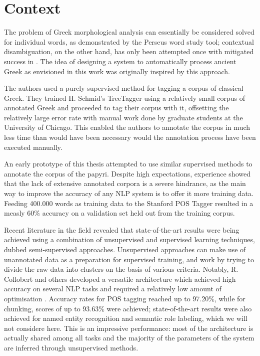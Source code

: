 \section{Context}

The problem of Greek morphological analysis can essentially be
considered solved for individual words, as demonstrated by the Perseus
word study tool; contextual disambiguation, on the other hand, has
only been attempted once with mitigated success in
\cite{dik2008,dik2009}. The idea of designing a system to
automatically process ancient Greek as envisioned in this work was
originally inspired by this approach.

The authors used a purely supervised method for tagging a corpus of
classical Greek. They trained H. Schmid's TreeTagger using a
relatively small corpus of annotated Greek and proceeded to tag their
corpus with it, offsetting the relatively large error rate with manual
work done by graduate students at the University of Chicago. This
enabled the authors to annotate the corpus in much less time than
would have been necessary would the annotation process have been
executed manually.

An early prototype of this thesis attempted to use similar supervised
methods to annotate the corpus of the papyri. Despite high
expectations, experience showed that the lack of extensive annotated
corpora is a severe hindrance, as the main way to improve the accuracy
of any NLP system is to offer it more training data. Feeding 400.000
words as training data to the Stanford POS Tagger resulted in a measly
60\% accuracy on a validation set held out from the training corpus.

Recent literature in the field revealed that state-of-the-art results
were being achieved using a combination of unsupervised and supervised
learning techniques, dubbed semi-supervised approaches. Unsupervised
approaches can make use of unannotated data as a preparation for
supervised training, and work by trying to divide the raw data into
clusters on the basis of various criteria. Notably, R. Collobert and
others developed a versatile architecture which achieved high accuracy
on several NLP tasks and required a relatively low amount of
optimisation \citep{collobert2008,collobert-2011}. Accuracy rates for
POS tagging reached up to 97.20\%, while for chunking, scores of up to
93.63\% were achieved; state-of-the-art results were also achieved for
named entity recognition and semantic role labeling, which we will not
considere here. This is an impressive performance: most of the
architecture is actually shared among all tasks and the majority of
the parameters of the system are inferred through unsupervised
methods.

